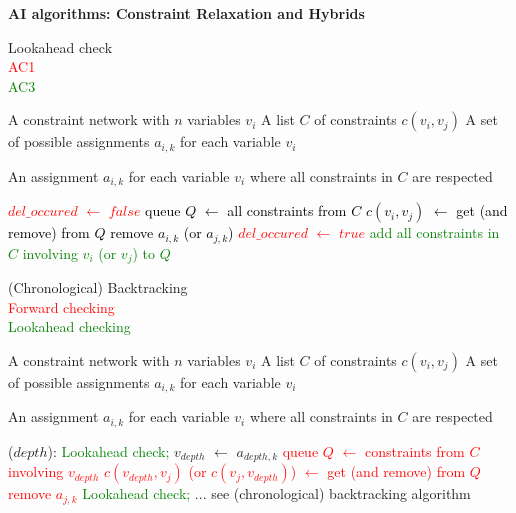 \documentclass[11pt] {article}
\newcommand{\algorithmicinput}{\textbf{Input:}}
\newcommand{\algorithmicoutput}{\textbf{Output:}}
\newcommand{\INPUT}{\item[\algorithmicinput]}
\newcommand{\OUTPUT}{\item[\algorithmicoutput]}
\newcommand{\algorithmicalgo}{\textbf{Algorithm:}}
\newcommand{\ALGO}{\item[\algorithmicalgo]}
\newcommand{\algorithmicalgos}{\textbf{Algorithm}}
\newcommand{\ALGOS}{\item[\algorithmicalgos]}
\begin{document}
\pagestyle{empty}

\begin{landscape}

\begin{center}
\LARGE
\textbf{AI algorithms: Constraint Relaxation and Hybrids}\\
\end{center}
\vspace{1cm}
\begin{multicols}{2}{
\noindent Lookahead check\\
\textcolor{red}{AC1}\\
\textcolor{green}{AC3}\\

\begin{algorithmic}
\INPUT
\STATE A constraint network with $n$ variables $v_i$
\STATE A list $C$ of constraints $c(v_i,v_j)$
\STATE A set of possible assignments $a_{i,k}$ for each variable $v_i$

\OUTPUT
\STATE An assignment $a_{i,k}$ for each variable $v_i$ where all constraints in $C$ are respected
\end{algorithmic}\begin{algorithmic}
\ALGO
\textcolor{red}{
\REPEAT
\STATE $del\_occured$ $\leftarrow$ $false$
\textcolor{black}{
\STATE queue $Q$ $\leftarrow$ all constraints from $C$
\STATE $c(v_i,v_j)$ $\leftarrow$ get (and remove) from $Q$
\STATE remove $a_{i,k}$ (or $a_{j,k}$)
\STATE \textcolor{red}{$del\_occured$ $\leftarrow$ $true$}
\STATE \textcolor{green}{add all constraints in $C$ involving $v_i$ (or $v_j$) to $Q$}
\ENDIF
\ENDWHILE
}
}
\end{algorithmic}


\noindent (Chronological) Backtracking\\
\textcolor{red}{Forward checking}\\
\textcolor{green}{Lookahead checking}\\

\begin{algorithmic}
\INPUT
\STATE A constraint network with $n$ variables $v_i$
\STATE A list $C$ of constraints $c(v_i,v_j)$
\STATE A set of possible assignments $a_{i,k}$ for each variable $v_i$

\OUTPUT
\STATE An assignment $a_{i,k}$ for each variable $v_i$ where all constraints in $C$ are respected
\end{algorithmic}\begin{algorithmic}
\ALGOS($depth$):
\STATE \textcolor{green}{Lookahead check;}
\STATE $v_{depth}$ $\leftarrow$ $a_{depth,k}$
\textcolor{red}{
\STATE queue $Q$ $\leftarrow$ constraints from $C$ involving $v_{depth}$
\STATE $c(v_{depth},v_j)$ (or $c(v_j,v_{depth})$) $\leftarrow$ get (and remove) from $Q$
\STATE remove $a_{j,k}$
\ENDIF
\ENDWHILE
}
\STATE \textcolor{green}{Lookahead check;}
\STATE ... see (chronological) backtracking algorithm 
\ENDFOR
\end{algorithmic}
}
\end{multicols}
\end{landscape}
\end{document}
